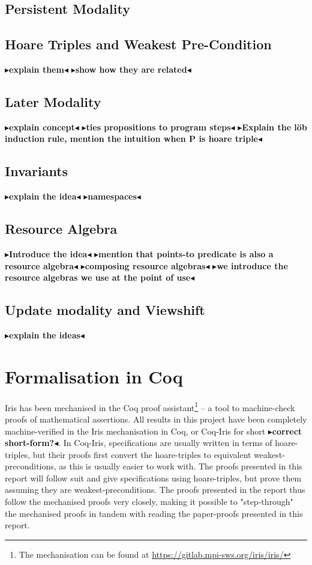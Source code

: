 \documentclass[a4paper, 11pt]{report}
\newcommand{\todo}[1]{{\color[rgb]{.5,0,0}\textbf{$\blacktriangleright$#1$\blacktriangleleft$}}}
\begin{document}
\subsection{Persistent Modality}

\subsection{Hoare Triples and Weakest Pre-Condition}
\todo{explain them}
\todo{show how they are related}

\subsection{Later Modality}
\todo{explain concept}
\todo{ties propositions to program steps}
\todo{Explain the löb induction rule, mention the intuition when P is hoare triple}

\subsection{Invariants}
\todo{explain the idea}
\todo{namespaces}

\subsection{Resource Algebra}
\todo{Introduce the idea}
\todo{mention that points-to predicate is also a resource algebra}
\todo{composing resource algebras}
\todo{we introduce the resource algebras we use at the point of use}

\subsection{Update modality and Viewshift}
\todo{explain the ideas}


\section{Formalisation in Coq}
\label{Pre:section:coq}

Iris has been mechanised in the Coq proof assistant\footnote{The mechanisation can be found at \url{https://gitlab.mpi-sws.org/iris/iris/}} -- a tool to machine-check proofs of mathematical assertions. All results in this project have been completely machine-verified in the Iris mechanisation in Coq, or Coq-Iris for short \todo{correct short-form?}. In Coq-Iris, specifications are usually written in terms of hoare-triples, but their proofs first convert the hoare-triples to equivalent weakest-preconditions, as this is usually easier to work with. The proofs presented in this report will follow suit and give specifications using hoare-triples, but prove them assuming they are weakest-preconditions. The proofs presented in the report thus follow the mechanised proofs very closely, making it possible to "step-through" the mechanised proofs in tandem with reading the paper-proofs presented in this report.
\end{document}
